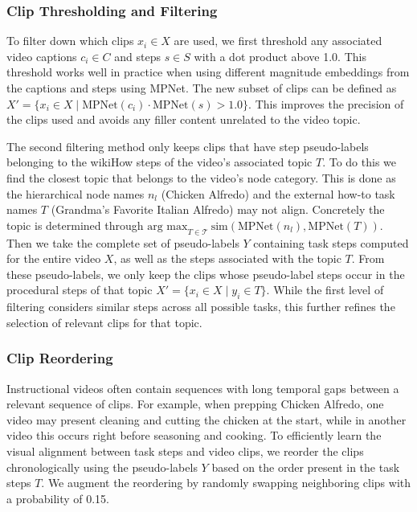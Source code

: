 \subsubsection{Clip Thresholding and Filtering}


To filter down which clips $x_i \in X$ are used, we first threshold any associated video captions $c_i \in C$ and steps $s \in S$ with a dot product above 1.0. This threshold works well in practice when using different magnitude embeddings from the captions and steps using MPNet. The new subset of clips can be defined as $X' = \{x_i \in X \mid \text{MPNet}(c_i) \cdot \text{MPNet}(s) > 1.0\}$. This improves the precision of the clips used and avoids any filler content unrelated to the video topic. 

The second filtering method only keeps clips that have step pseudo-labels belonging to the wikiHow steps of the video's associated topic $T$. To do this we find the closest topic that belongs to the video's node category. This is done as the hierarchical node names $n_l$ (Chicken Alfredo) and the external how-to task names $T$ (Grandma's Favorite Italian Alfredo) may not align. Concretely the topic is determined through
$\text{arg max}_{T \in \mathcal{T}}\ \text{sim}(\text{MPNet}(n_l), \text{MPNet}(T))$.
Then we take the complete set of pseudo-labels $Y$ containing task steps computed for the entire video $X$, as well as the steps associated with the topic $T$. From these pseudo-labels, we only keep the clips whose pseudo-label steps occur in the procedural steps of that topic $X' = \{x_i \in X \mid y_i \in T\}$. While the first level of filtering considers similar steps across all possible tasks, this further refines the selection of relevant clips for that topic. 

\subsubsection{Clip Reordering}

Instructional videos often contain sequences with long temporal gaps between a relevant sequence of clips. For example, when prepping Chicken Alfredo, one video may present cleaning and cutting the chicken at the start, while in another video this occurs right before seasoning and cooking. To efficiently learn the visual alignment between task steps and video clips, we reorder the clips chronologically using the pseudo-labels $Y$ based on the order present in the task steps $T$. We augment the reordering by randomly swapping neighboring clips with a probability of 0.15.  

